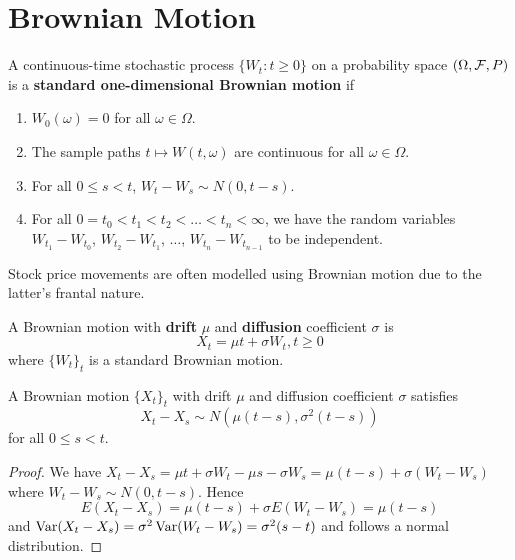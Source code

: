 \documentclass[11pt,fleqn]{book} %
\begin{document}

\section{Brownian Motion}

\begin{definition} \label{def:321}
A continuous-time stochastic process \(\{W_t: t \geq 0\}\) on a probability space \((\Omega, \mathcal{F}, P)\) is a \textbf{standard one-dimensional Brownian motion} if
\begin{enumerate}
\item \(W_0(\omega) = 0\) for all \(\omega \in \Omega\).
\item The sample paths \(t\mapsto W(t, \omega)\) are continuous for all \(\omega \in \Omega\).
\item For all \(0 \leq s < t\), \(W_t - W_s \sim N(0, t - s)\).
\item For all \(0 = t_0 < t_1 < t_2 < \ldots < t_n < \infty\), we have the random variables \(W_{t_1} - W_{t_0}\), \(W_{t_2} - W_{t_1}\), \(\ldots\), \(W_{t_n} - W_{t_{n - 1}}\) to be independent.
\end{enumerate}
\end{definition}

\begin{remark} \label{rmk:322}
Stock price movements are often modelled using Brownian motion due to the latter's frantal nature.
\end{remark}

\begin{definition} \label{def:323}
A Brownian motion with \textbf{drift} \(\mu\) and \textbf{diffusion} coefficient \(\sigma\) is
\[
X_t = \mu t + \sigma W_t, t \geq 0
\]
where \(\{W_t\}_t\) is a standard Brownian motion.
\end{definition}

\begin{proposition} \label{prop:324}
A Brownian motion \(\{X_t\}_t\) with drift \(\mu\) and diffusion coefficient \(\sigma\) satisfies
\[
X_t - X_s \sim N(\mu(t - s), \sigma^2(t - s))
\]
for all \(0 \leq s < t\).
\end{proposition}
\begin{proof} We have \(X_t - X_s = \mu t + \sigma W_t - \mu s - \sigma W_s = \mu(t - s)+\sigma(W_t - W_s)\) where \(W_t - W_s \sim N(0, t - s)\). Hence
\[
E(X_t - X_s) = \mu(t - s) + \sigma E(W_t - W_s) = \mu(t - s)
\]
and \(\operatorname{Var}(X_t - X_s) = \sigma^2\operatorname{Var}(W_t - W_s) = \sigma^2(s - t)\) and follows a normal distribution.
\end{proof}
\end{document}
